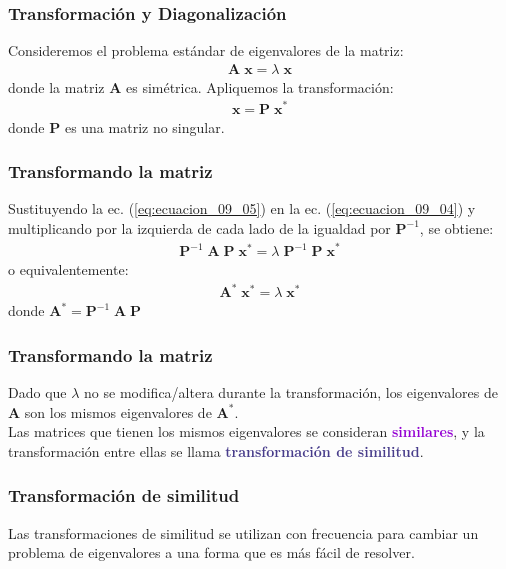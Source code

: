 \documentclass[12pt]{beamer}
\begin{document}
\begin{frame}
\frametitle{Transformación y Diagonalización}
Consideremos el problema estándar de eigenvalores de la matriz:
\begin{align}
\mathbf{A \; x} = \lambda \; \mathbf{x}
\label{eq:ecuacion_09_04}
\end{align}
donde la matriz $\mathbf{A}$ es simétrica. \pause Apliquemos la transformación:
\begin{align}
\mathbf{x} = \mathbf{P \; x^{*}}
\label{eq:ecuacion_09_05}
\end{align}
donde $\mathbf{P}$ es una matriz no singular.
\end{frame}
\begin{frame}
\frametitle{Transformando la matriz}
Sustituyendo la ec. (\ref{eq:ecuacion_09_05}) en la ec. (\ref{eq:ecuacion_09_04}) y multiplicando por la izquierda de cada lado de la igualdad por $\mathbf{P}^{-1}$, se obtiene:
\begin{align*}
\mathbf{P}^{-1} \; \mathbf{A \; P \; x^{*}} = \lambda \; \mathbf{P}^{-1} \; \mathbf{P \; x}^{*}
\end{align*}
\pause
o equivalentemente:
\pause
\begin{align}
\mathbf{A}^{*} \; \mathbf{x}^{*} = \lambda \; \mathbf{x}^{*}
\label{eq:ecuacion_09_06}
\end{align}
donde $\mathbf{A}^{*} = \mathbf{P}^{-1} \; \mathbf{A \; P}$
\end{frame}
\begin{frame}
\frametitle{Transformando la matriz}
Dado que $\lambda$ no se modifica/altera durante la transformación, los eigenvalores de $\mathbf{A}$ son los mismos eigenvalores de $\mathbf{A}^{*}$.
\\
\bigskip
\pause 
Las matrices que tienen los mismos eigenvalores se consideran \textbf{\textcolor{darkviolet}{similares}}, \pause y la transformación entre ellas se llama \textbf{\textcolor{darkslateblue}{transformación de similitud}}.
\end{frame}
\begin{frame}
\frametitle{Transformación de similitud}
Las transformaciones de similitud se utilizan con frecuencia para cambiar un problema de eigenvalores a una forma que es más fácil de resolver.
\end{frame}
\end{document}
